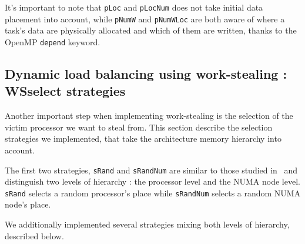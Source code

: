 \documentclass{Styles/llncs}
\begin{document}
    It's important to note that \verb!pLoc! and \verb!pLocNum! does not take initial data placement into account, while \verb!pNumW! and \verb!pNumWLoc! are both aware of where a task's data are physically allocated and which of them are written, thanks to the OpenMP \verb!depend! keyword.

\subsection{Dynamic load balancing using work-stealing : WSselect strategies}

Another important step when implementing work-stealing is the selection of the victim processor we want to steal from.
This section describe the selection strategies we implemented, that take the architecture memory hierarchy into account.

The first two strategies, \verb!sRand! and \verb!sRandNum! are similar to those studied in~\cite{DBLP:journals/ijhpca/OlivierPWSP12}
and distinguish two levels of hierarchy : the processor level and the NUMA node level.
\verb/sRand/ selects a random processor's place while \verb/sRandNum/ selects a random NUMA node's place.

We additionally implemented several strategies mixing both levels of hierarchy,
described below.
\end{document}
